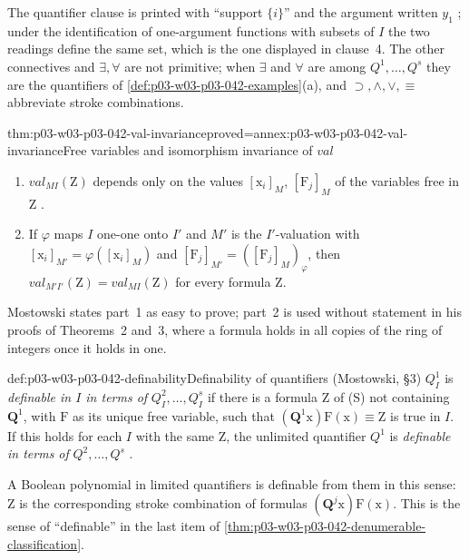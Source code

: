 The quantifier clause is printed with ``support \(\{i\}\)'' and the
argument written \(y_1\) \cite[p.~16]{Mostowski1957}; under the
identification of one-argument functions with subsets of \(I\) the two
readings define the same set, which is the one displayed in clause~4.
The other connectives and \(\exists,\forall\) are not primitive; when
\(\exists\) and \(\forall\) are among \(Q^1,\ldots,Q^s\) they are the
quantifiers of \cref{def:p03-w03-p03-042-examples}(a), and
\(\supset,\wedge,\vee,\equiv\) abbreviate stroke combinations.

\begin{hblemma}{thm:p03-w03-p03-042-val-invariance}{proved=annex:p03-w03-p03-042-val-invariance}{Free variables and isomorphism invariance of \(\mathit{val}\)}
\begin{enumerate}
\item \(\mathit{val}_{MI}(\mathrm Z)\) depends only on the values
      \([\mathrm x_i]_M\), \([\mathrm F_j]_M\) of the variables free in
      \(\mathrm Z\) \cite[p.~16]{Mostowski1957}.
\item If \(\varphi\) maps \(I\) one-one onto \(I'\) and \(M'\) is the
      \(I'\)-valuation with \([\mathrm x_i]_{M'}=\varphi([\mathrm x_i]_M)\)
      and \([\mathrm F_j]_{M'}=([\mathrm F_j]_M)_\varphi\), then
      \(\mathit{val}_{M'I'}(\mathrm Z)=\mathit{val}_{MI}(\mathrm Z)\) for
      every formula \(\mathrm Z\).
\end{enumerate}
\end{hblemma}

Mostowski states part~1 as easy to prove; part~2 is used without
statement in his proofs of Theorems~2 and~3, where a formula holds in all
copies of the ring of integers once it holds in one.

\begin{hbdefinition}{def:p03-w03-p03-042-definability}{Definability of quantifiers (Mostowski, \S3)}
\(Q^1_I\) is \emph{definable in \(I\) in terms of} \(Q^2_I,\ldots,Q^s_I\)
if there is a formula \(\mathrm Z\) of (S) not containing \(\mathbf Q^1\),
with \(\mathrm F\) as its unique free variable, such that
\((\mathbf Q^1\mathrm x)\mathrm F(\mathrm x)\equiv\mathrm Z\) is true in
\(I\).  If this holds for each \(I\) with the same \(\mathrm Z\), the
unlimited quantifier \(Q^1\) is \emph{definable in terms of}
\(Q^2,\ldots,Q^s\) \cite[p.~17]{Mostowski1957}.
\end{hbdefinition}

A Boolean polynomial in limited quantifiers is definable from them in this
sense: \(\mathrm Z\) is the corresponding stroke combination of formulas
\((\mathbf Q^j\mathrm x)\mathrm F(\mathrm x)\).  This is the sense of
``definable'' in the last item of
\cref{thm:p03-w03-p03-042-denumerable-classification}.

